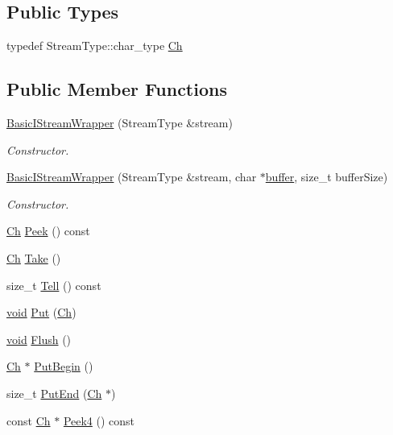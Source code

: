 \subsection*{Public Types}
\begin{DoxyCompactItemize}
\item 
typedef Stream\+Type\+::char\+\_\+type \hyperlink{classBasicIStreamWrapper_a88e4288ecdaa0d31ddf4e5917b9aa8d7}{Ch}
\end{DoxyCompactItemize}
\subsection*{Public Member Functions}
\begin{DoxyCompactItemize}
\item 
\hyperlink{classBasicIStreamWrapper_a3e9a2dd2b6b28243f8f2a911f67cdf56}{Basic\+I\+Stream\+Wrapper} (Stream\+Type \&stream)
\begin{DoxyCompactList}\small\item\em Constructor. \end{DoxyCompactList}\item 
\hyperlink{classBasicIStreamWrapper_a7a87c6702f1e98256de416ee101a460f}{Basic\+I\+Stream\+Wrapper} (Stream\+Type \&stream, char $\ast$\hyperlink{imgui__impl__opengl3__loader_8h_a3667f558219c90437106b544a3ca00b8}{buffer}, size\+\_\+t buffer\+Size)
\begin{DoxyCompactList}\small\item\em Constructor. \end{DoxyCompactList}\item 
\hyperlink{classBasicIStreamWrapper_a88e4288ecdaa0d31ddf4e5917b9aa8d7}{Ch} \hyperlink{classBasicIStreamWrapper_a0ad1488235b4786dd4f7a16e679dec88}{Peek} () const
\item 
\hyperlink{classBasicIStreamWrapper_a88e4288ecdaa0d31ddf4e5917b9aa8d7}{Ch} \hyperlink{classBasicIStreamWrapper_afb71f0329d0abbbc9b22ebeb5c1464d1}{Take} ()
\item 
size\+\_\+t \hyperlink{classBasicIStreamWrapper_ac212848265f937add49bd973de794e25}{Tell} () const
\item 
\hyperlink{imgui__impl__opengl3__loader_8h_ac668e7cffd9e2e9cfee428b9b2f34fa7}{void} \hyperlink{classBasicIStreamWrapper_afa71cb2f5b7668837d0a81e3bce55e69}{Put} (\hyperlink{classBasicIStreamWrapper_a88e4288ecdaa0d31ddf4e5917b9aa8d7}{Ch})
\item 
\hyperlink{imgui__impl__opengl3__loader_8h_ac668e7cffd9e2e9cfee428b9b2f34fa7}{void} \hyperlink{classBasicIStreamWrapper_a37d5e4cd8fdf3c83dad50737e95886a9}{Flush} ()
\item 
\hyperlink{classBasicIStreamWrapper_a88e4288ecdaa0d31ddf4e5917b9aa8d7}{Ch} $\ast$ \hyperlink{classBasicIStreamWrapper_a62a3fc10b009ea231fb9d2dc958c539c}{Put\+Begin} ()
\item 
size\+\_\+t \hyperlink{classBasicIStreamWrapper_ab2ead53490207a1cb0bdd674a03957f3}{Put\+End} (\hyperlink{classBasicIStreamWrapper_a88e4288ecdaa0d31ddf4e5917b9aa8d7}{Ch} $\ast$)
\item 
const \hyperlink{classBasicIStreamWrapper_a88e4288ecdaa0d31ddf4e5917b9aa8d7}{Ch} $\ast$ \hyperlink{classBasicIStreamWrapper_ae8b52683adc67ca0b91484a427aed660}{Peek4} () const
\end{DoxyCompactItemize}
